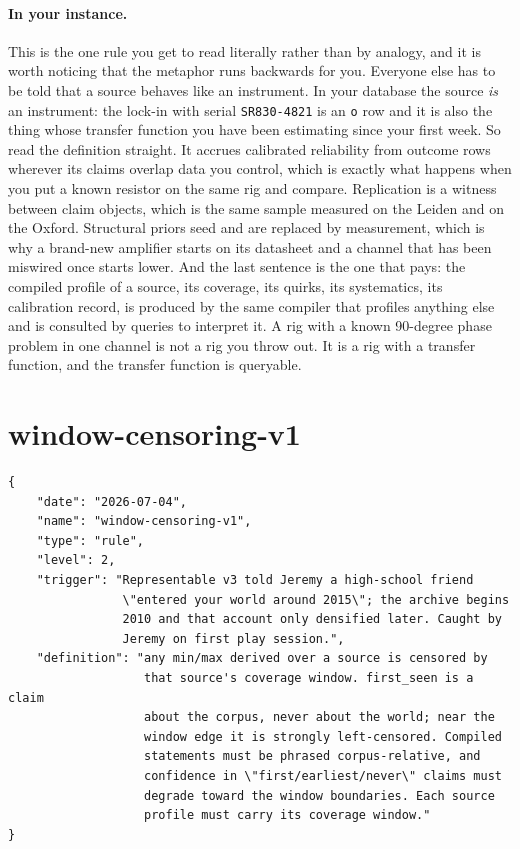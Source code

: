 \paragraph{In your instance.} This is the one rule you get to read literally rather than by analogy, and it is worth noticing that the metaphor runs backwards for you. Everyone else has to be told that a source behaves like an instrument. In your database the source \emph{is} an instrument: the lock-in with serial \texttt{SR830-4821} is an \texttt{o} row and it is also the thing whose transfer function you have been estimating since your first week. So read the definition straight. It accrues calibrated reliability from outcome rows wherever its claims overlap data you control, which is exactly what happens when you put a known resistor on the same rig and compare. Replication is a witness between claim objects, which is the same sample measured on the Leiden and on the Oxford. Structural priors seed and are replaced by measurement, which is why a brand-new amplifier starts on its datasheet and a channel that has been miswired once starts lower. And the last sentence is the one that pays: the compiled profile of a source, its coverage, its quirks, its systematics, its calibration record, is produced by the same compiler that profiles anything else and is consulted by queries to interpret it. A rig with a known 90-degree phase problem in one channel is not a rig you throw out. It is a rig with a transfer function, and the transfer function is queryable.

\section{window-censoring-v1}

\begin{lstlisting}[language={},basicstyle=\ttfamily\footnotesize]
{
    "date": "2026-07-04",
    "name": "window-censoring-v1",
    "type": "rule",
    "level": 2,
    "trigger": "Representable v3 told Jeremy a high-school friend
                \"entered your world around 2015\"; the archive begins
                2010 and that account only densified later. Caught by
                Jeremy on first play session.",
    "definition": "any min/max derived over a source is censored by
                   that source's coverage window. first_seen is a claim
                   about the corpus, never about the world; near the
                   window edge it is strongly left-censored. Compiled
                   statements must be phrased corpus-relative, and
                   confidence in \"first/earliest/never\" claims must
                   degrade toward the window boundaries. Each source
                   profile must carry its coverage window."
}
\end{lstlisting}

